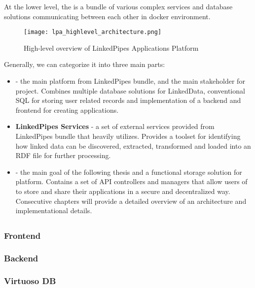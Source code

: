At the lower level, the \lpa{} is a bundle of various complex services and database solutions communicating between each other in docker environment. 

\begin{figure}[h]
    \centering
    \texttt{[image: lpa\_highlevel\_architecture.png]}
    \caption{High-level overview of LinkedPipes Applications Platform}
    \label{fig:lpa-high-level-arch}
\end{figure}

Generally, we can categorize it into three main parts: 

\begin{itemize}
    \item \textbf{\lpa{}} - the main platform from LinkedPipes bundle, and the main stakeholder for \lpas{} project. Combines multiple database solutions for LinkedData, conventional SQL for storing user related records and implementation of a backend and frontend for creating applications.
    \item \textbf{LinkedPipes Services} - a set of external services provided from LinkedPipes bundle that \lpa{} heavily utilizes. Provides a toolset for identifying how linked data can be discovered, extracted, transformed and loaded into an RDF file for further processing.
    \item \textbf{\lpas{}} - the main goal of the following thesis and a functional storage solution for \lpa{} platform. Contains a set of API controllers and managers that allow users of \lpa{} to store and share their applications in a secure and decentralized way. Consecutive chapters will provide a detailed overview of an architecture and implementational details.
\end{itemize}

\subsection{\lpa{}}

\subsubsection{Frontend}

\subsubsection{Backend}

\subsubsection{Virtuoso DB}

